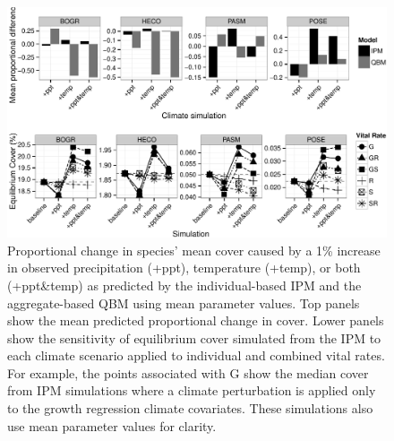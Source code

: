 \documentclass[12pt,]{article}
\begin{document}
\begin{figure}[htbp]
\centering
\includegraphics{components/figure/manuscript-figure_3.pdf}
\caption{Proportional change in species' mean cover caused by a 1\%
increase in observed precipitation (+ppt), temperature (+temp), or both
(+ppt\&temp) as predicted by the individual-based IPM and the
aggregate-based QBM using mean parameter values. Top panels show the
mean predicted proportional change in cover. Lower panels show the
sensitivity of equilibrium cover simulated from the IPM to each climate
scenario applied to individual and combined vital rates. For example,
the points associated with G show the median cover from IPM simulations
where a climate perturbation is applied only to the growth regression
climate covariates. These simulations also use mean parameter values for
clarity.}
\end{figure}
\end{document}
